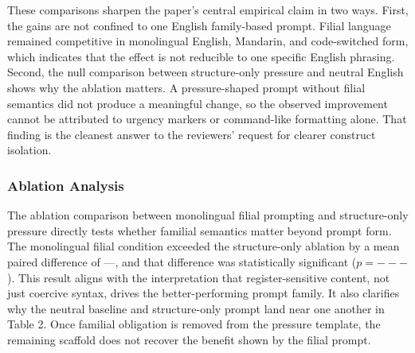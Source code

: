 \documentclass{article}
\begin{document}
\begin{table}[ht]
\centering
\caption{Comparison of Comparison across Mean paired difference, \(p\)-value}
\label{tab:3}
\end{table}

These comparisons sharpen the paper's central empirical claim in two ways. First, the gains are not confined to one English family-based prompt. Filial language remained competitive in monolingual English, Mandarin, and code-switched form, which indicates that the effect is not reducible to one specific English phrasing. Second, the null comparison between structure-only pressure and neutral English shows why the ablation matters. A pressure-shaped prompt without filial semantics did not produce a meaningful change, so the observed improvement cannot be attributed to urgency markers or command-like formatting alone. That finding is the cleanest answer to the reviewers' request for clearer construct isolation.

\subsubsection{Ablation Analysis}

\label{sec:ablation_analysis}

The ablation comparison between monolingual filial prompting and structure-only pressure directly tests whether familial semantics matter beyond prompt form. The monolingual filial condition exceeded the structure-only ablation by a mean paired difference of ---, and that difference was statistically significant (\(p=---\)). This result aligns with the interpretation that register-sensitive content, not just coercive syntax, drives the better-performing prompt family. It also clarifies why the neutral baseline and structure-only prompt land near one another in Table 2. Once familial obligation is removed from the pressure template, the remaining scaffold does not recover the benefit shown by the filial prompt.
\end{document}
